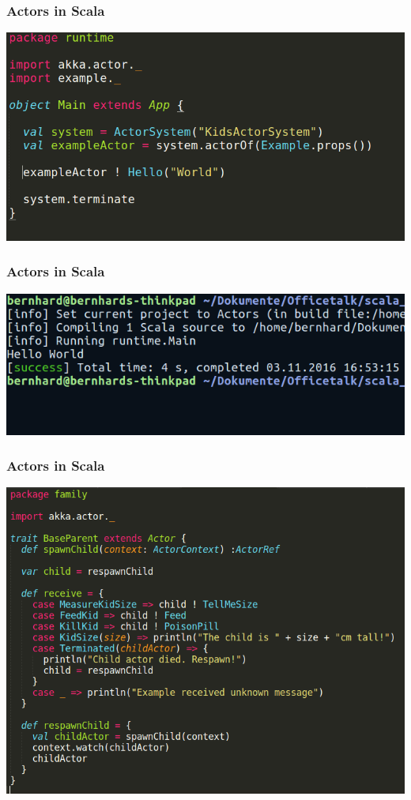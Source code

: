 \documentclass{beamer}
\begin{document}
\begin{frame}
\frametitle{Actors in Scala}
\includegraphics[width=1\linewidth]{./scala_example_main.png}
\end{frame}


\begin{frame}
\frametitle{Actors in Scala}
\includegraphics[width=1\linewidth]{./scala_example_terminal.png}
\end{frame}


\begin{frame}
\frametitle{Actors in Scala}
\includegraphics[width=0.8\linewidth]{./parent_trait.png}
\end{frame}
\end{document}
